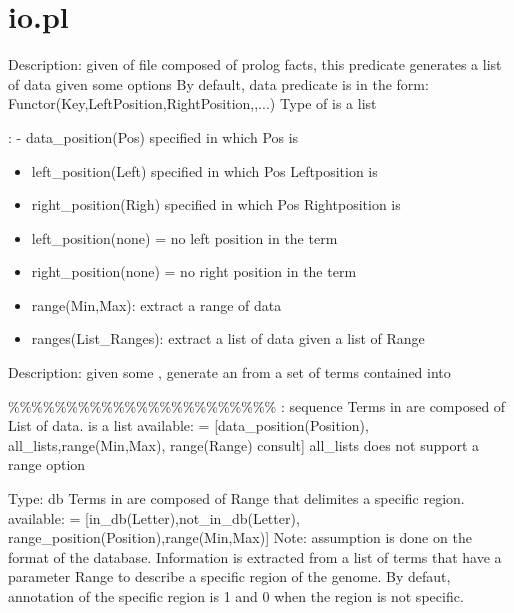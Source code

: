 


\section{io.pl}

\label{sec:io}

\begin{description}
Description: given of file composed of prolog facts,
this predicate generates a list of data given some options
By default, data predicate is in the form:
Functor(Key,LeftPosition,RightPosition,,...)
Type of  is a list

: - data_position(Pos) specified in which Pos  is

\begin{itemize}
    \item left_position(Left) specified in which Pos Leftposition is
    \item right_position(Righ) specified in which Pos Rightposition is
    \item left_position(none) = no left position in the term
    \item right_position(none) = no right position in the term
    \item range(Min,Max): extract a range of data
    \item ranges(List_Ranges): extract a list of data given a list of Range
\end{itemize}

Description: given some , generate an  from a set of terms contained into 

\begin{center}
\%\%\%\%\%\%\%\%\%\%\%\%\%\%\%\%\%\%\%\%\%\%\%
: sequence
Terms in  are composed of List of data.
 is a list
 available:  = [data_position(Position),
all_lists,range(Min,Max),
range(Range)
consult]
all_lists does not support a range option
\end{center}

\begin{center}
Type: db
Terms in  are composed of Range that delimites a specific region.
 available:  = [in_db(Letter),not_in_db(Letter),
range_position(Position),range(Min,Max)]
Note: assumption is done on the format of the database. Information is extracted from a list
of terms that have a parameter Range to describe a specific region of the genome.
By defaut, annotation of the specific region is 1 and 0 when the region is not specific.
\end{center}


\end{description}
